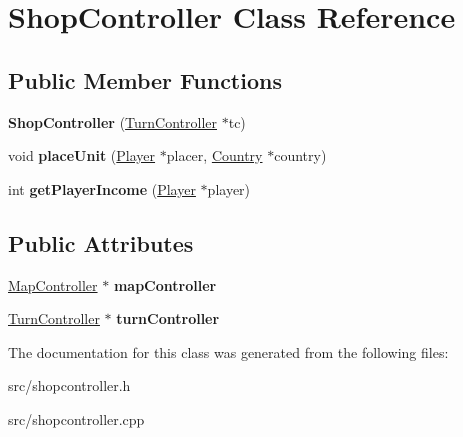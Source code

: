 \hypertarget{class_shop_controller}{}\section{Shop\+Controller Class Reference}
\label{class_shop_controller}
\subsection*{Public Member Functions}
\begin{DoxyCompactItemize}
\item 
\hypertarget{class_shop_controller_a02945177e65fca47c9cddee1a7b3fdb6}{}{\bfseries Shop\+Controller} (\hyperlink{class_turn_controller}{Turn\+Controller} $\ast$tc)\label{class_shop_controller_a02945177e65fca47c9cddee1a7b3fdb6}

\item 
\hypertarget{class_shop_controller_a6f1f54172f914d26432bee8cf2f888ed}{}void {\bfseries place\+Unit} (\hyperlink{class_player}{Player} $\ast$placer, \hyperlink{class_country}{Country} $\ast$country)\label{class_shop_controller_a6f1f54172f914d26432bee8cf2f888ed}

\item 
\hypertarget{class_shop_controller_acca2acc6d4aa2ad91db60f8461e74ad1}{}int {\bfseries get\+Player\+Income} (\hyperlink{class_player}{Player} $\ast$player)\label{class_shop_controller_acca2acc6d4aa2ad91db60f8461e74ad1}

\end{DoxyCompactItemize}
\subsection*{Public Attributes}
\begin{DoxyCompactItemize}
\item 
\hypertarget{class_shop_controller_a44304a0e1de2f28cdcce75b9ae265a83}{}\hyperlink{class_map_controller}{Map\+Controller} $\ast$ {\bfseries map\+Controller}\label{class_shop_controller_a44304a0e1de2f28cdcce75b9ae265a83}

\item 
\hypertarget{class_shop_controller_a3d14a370bf604d6f52f3a94749dd1913}{}\hyperlink{class_turn_controller}{Turn\+Controller} $\ast$ {\bfseries turn\+Controller}\label{class_shop_controller_a3d14a370bf604d6f52f3a94749dd1913}

\end{DoxyCompactItemize}


The documentation for this class was generated from the following files\+:\begin{DoxyCompactItemize}
\item 
src/shopcontroller.\+h\item 
src/shopcontroller.\+cpp\end{DoxyCompactItemize}
